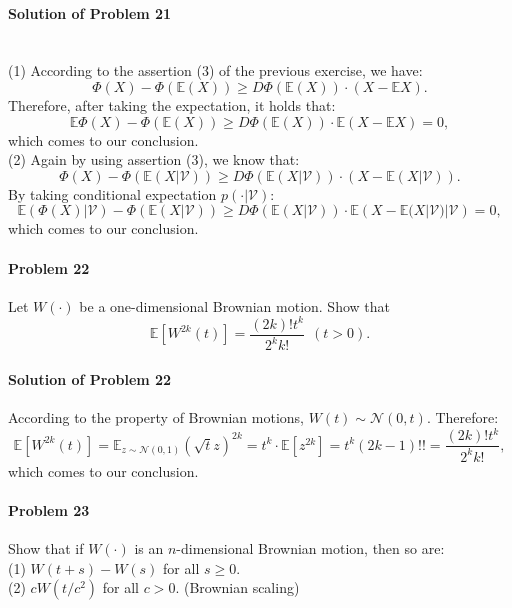 \documentclass{article}
\begin{document}
\paragraph{Solution of Problem 21}~\\
(1) According to the assertion (3) of the previous exercise, we have:
\[\Phi(X)-\Phi(\mathbb{E}(X))\geqslant D\Phi(\mathbb{E}(X))\cdot(X-\mathbb{E}X).\]
Therefore, after taking the expectation, it holds that:
\[\mathbb{E}\Phi(X)-\Phi(\mathbb{E}(X))\geqslant D\Phi(\mathbb{E}(X))\cdot \mathbb{E}\left(X-\mathbb{E}X\right) = 0,\]
which comes to our conclusion. \\
(2) Again by using assertion (3), we know that:
\[\Phi(X)-\Phi(\mathbb{E}(X|\mathcal V))\geqslant D\Phi(\mathbb{E}(X|\mathcal V))\cdot(X-\mathbb{E}(X|\mathcal V)).\]
By taking conditional expectation $p(\cdot|\mathcal V)$:
\[\mathbb{E}(\Phi(X)|\mathcal V)-\Phi(\mathbb{E}(X|\mathcal V))\geqslant D\Phi(\mathbb{E}(X|\mathcal V))\cdot\mathbb{E}\left(X-\mathbb{E}(X|\mathcal V)|\mathcal V\right)=0,\]
which comes to our conclusion.




\paragraph{Problem 22} Let $W(\cdot)$ be a one-dimensional Brownian motion. Show that
\[\mathbb{E}[W^{2k}(t)]=\frac{(2k)!t^k}{2^k k!}~~(t>0).\]

\paragraph{Solution of Problem 22} According to the property of Brownian motions, $W(t)\sim\mathcal N(0,t)$. Therefore:
\[\mathbb{E}[W^{2k}(t)]=\mathbb{E}_{z\sim\mathcal N(0,1)}(\sqrt{t}z)^{2k}= t^k\cdot\mathbb{E}[z^{2k}]=t^k(2k-1)!!=\frac{(2k)!t^k}{2^k k!},\]
which comes to our conclusion. 


\paragraph{Problem 23} Show that if $W(\cdot)$ is an $n$-dimensional Brownian motion, then so are:\\
(1) $W(t+s)-W(s)$ for all $s\geqslant 0$.\\
(2) $cW(t/c^2)$ for all $c>0$. (Brownian scaling)
\end{document}
